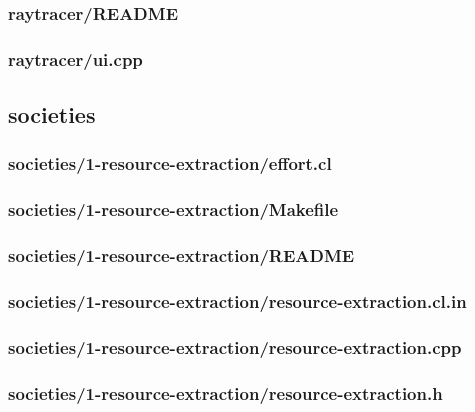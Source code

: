 \documentclass{article}
\begin{document}
\subsubsection*{raytracer/README}


\subsubsection*{raytracer/ui.cpp}


\subsection*{societies}
\subsubsection*{societies/1-resource-extraction/effort.cl}


\subsubsection*{societies/1-resource-extraction/Makefile}


\subsubsection*{societies/1-resource-extraction/README}


\subsubsection*{societies/1-resource-extraction/resource-extraction.cl.in}


\subsubsection*{societies/1-resource-extraction/resource-extraction.cpp}


\subsubsection*{societies/1-resource-extraction/resource-extraction.h}

\end{document}
